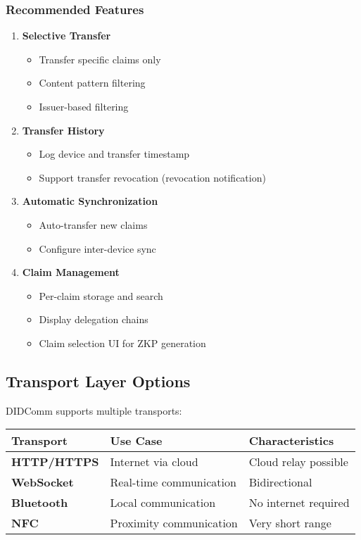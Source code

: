 \subsubsection{Recommended Features}

\begin{enumerate}
  \item \textbf{Selective Transfer}
    \begin{itemize}
      \item Transfer specific claims only
      \item Content pattern filtering
      \item Issuer-based filtering
    \end{itemize}

  \item \textbf{Transfer History}
    \begin{itemize}
      \item Log device and transfer timestamp
      \item Support transfer revocation (revocation notification)
    \end{itemize}

  \item \textbf{Automatic Synchronization}
    \begin{itemize}
      \item Auto-transfer new claims
      \item Configure inter-device sync
    \end{itemize}

  \item \textbf{Claim Management}
    \begin{itemize}
      \item Per-claim storage and search
      \item Display delegation chains
      \item Claim selection UI for ZKP generation
    \end{itemize}
\end{enumerate}

\subsection{Transport Layer Options}

DIDComm supports multiple transports:

\begin{table}[H]
\centering
\begin{tabular}{|l|l|l|}
\hline
\textbf{Transport} & \textbf{Use Case} & \textbf{Characteristics} \\
\hline
\textbf{HTTP/HTTPS} & Internet via cloud & Cloud relay possible \\
\hline
\textbf{WebSocket} & Real-time communication & Bidirectional \\
\hline
\textbf{Bluetooth} & Local communication & No internet required \\
\hline
\textbf{NFC} & Proximity communication & Very short range \\
\hline
\end{tabular}
\end{table}

